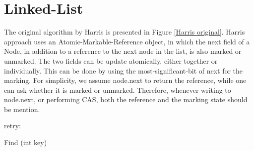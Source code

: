 \section{Linked-List}

The original algorithm by Harris is presented in Figure \ref{Harris original}. Harris approach uses an Atomic-Markable-Reference object, in which the next field of a Node, in addition to a reference to the next node in the list, is also marked or unmarked. The two fields can be update atomically, either together or individually. This can be done by using the most-significant-bit of next for the marking. For simplicity, we assume node.next to return the reference, while one can ask whether it is marked or unmarked. Therefore, whenever writing to node.next, or performing CAS, both the reference and the marking state should be mention.



\begin{procedure}[H]
		
	retry: 
		
	\caption{Find (int key)}
\end{procedure}

